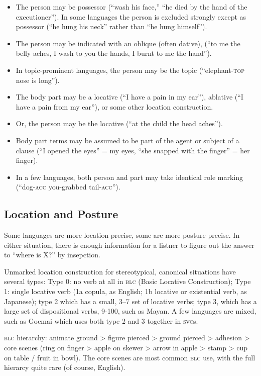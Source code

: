 \documentclass[11pt]{article}
\newcommand{\I}[1]{\textsc{#1}}   %
\newenvironment{grammarlist}%
 {\begin{itemize}\addtolength{\itemsep}{-0.5\baselineskip}\ignorespaces}%
 {\end{itemize}\ignorespacesafterend}
\begin{document}
\begin{grammarlist}
  \item The person may be possessor (``wash his face,'' ``he died by
    the hand of the executioner'').  In some languages the person is
    excluded strongly except as possessor (``he hung his neck'' rather
    than ``he hung himself'').
  \item The person may be indicated with an oblique (often dative),
    (``to me the belly aches, I wash to you the hands, I burnt to me
    the hand'').
  \item In topic-prominent languages, the person may be the topic
    (``elephant-\I{top} nose is long'').
  \item The body part may be a locative (``I have a pain in my ear''),
    ablative (``I have a pain from my ear''), or some other location
    construction.
  \item Or, the person may be the locative (``at the child the head
    aches'').
  \item Body part terms may be assumed to be part of the agent or
    subject of a clause (``I opened the eyes'' = my eyes, ``she
    snapped with the finger'' = her finger).
  \item In a few languages, both person and part may take identical
    role marking (``dog-\I{acc} you-grabbed tail-\I{acc}'').
\end{grammarlist}


\subsection{Location and Posture}
Some languages are more location precise, some are more posture
precise.  In either situation, there is enough information for a
listner to figure out the answer to ``where is X?'' by insepction.

Unmarked location construction for stereotypical, canonical situations
have several types: Type 0: no verb at all in \I{blc} (Basic Locative
Construction); Type 1: single locative verb (1a copula, as English; 1b
locative or existential verb, as Japanese); type 2 which has a small,
3--7 set of locative verbs; type 3, which has a large set of
dispositional verbs, 9-100, such as Mayan.  A few languages are mixed,
such as Goemai which uses both type 2 and 3 together in \I{svc}s.

\I{blc} hierarchy: animate ground > figure pierced > ground pierced >
adhesion > core scenes (ring on finger > apple on skewer > arrow in
apple > stamp > cup on table / fruit in bowl).  The core scenes are
most common \I{blc} use, with the full hierarcy quite rare (of course,
English).
\end{document}
